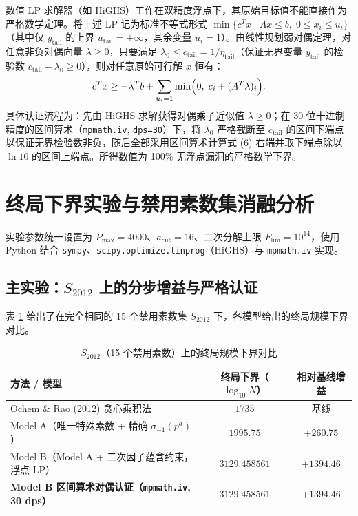 \documentclass[11pt, a4paper]{article}
\begin{document}
数值 LP 求解器（如 HiGHS）工作在双精度浮点下，其原始目标值不能直接作为严格数学定理。将上述 LP 记为标准不等式形式 $\min \{c^T x \mid A x \le b,\; 0 \le x_i \le u_i\}$（其中仅 $y_{\mathrm{tail}}$ 的上界 $u_{\mathrm{tail}} = +\infty$，其余变量 $u_i = 1$）。由线性规划弱对偶定理，对任意非负对偶向量 $\lambda \ge 0$，只要满足 $\lambda_0 \le c_{\mathrm{tail}} = 1/\eta_{\mathrm{tail}}$（保证无界变量 $y_{\mathrm{tail}}$ 的检验数 $c_{\mathrm{tail}} - \lambda_0 \ge 0$），则对任意原始可行解 $x$ 恒有：
\begin{equation}
c^T x \ge -\lambda^T b + \sum_{u_i = 1} \min\Bigl(0,\; c_i + (A^T \lambda)_i\Bigr).
\end{equation}
具体认证流程为：先由 HiGHS 求解获得对偶乘子近似值 $\lambda \ge 0$；在 30 位十进制精度的区间算术（\texttt{mpmath.iv}, \texttt{dps=30}）下，将 $\lambda_0$ 严格截断至 $c_{\mathrm{tail}}$ 的区间下端点以保证无界检验数非负，随后全部采用区间算术计算式 (6) 右端并取下端点除以 $\ln 10$ 的区间上端点。所得数值为 100\% 无浮点漏洞的严格数学下界。

\section{终局下界实验与禁用素数集消融分析}

实验参数统一设置为 $P_{\max} = 4000$、$a_{\mathrm{cut}} = 16$、二次分解上限 $F_{\mathrm{lim}} = 10^{14}$，使用 Python 结合 \texttt{sympy}、\texttt{scipy.optimize.linprog}（HiGHS）与 \texttt{mpmath.iv} 实现。

\subsection{主实验：$S_{2012}$ 上的分步增益与严格认证}

表 \ref{tab:main_endgame} 给出了在完全相同的 15 个禁用素数集 $S_{2012}$ 下，各模型给出的终局规模下界对比。

\begin{table}[htbp]
\centering
\caption{$S_{2012}$（15 个禁用素数）上的终局规模下界对比}
\label{tab:main_endgame}
\begin{tabular}{@{}lcc@{}}
\toprule
方法 / 模型 & 终局下界（$\log_{10} N$） & 相对基线增益 \\
\midrule
Ochem \& Rao (2012) 贪心乘积法 & $1735$ & 基线 \\
Model A（唯一特殊素数 + 精确 $\sigma_{-1}(p^a)$） & $1995.75$ & $+260.75$ \\
Model B（Model A + 二次因子蕴含约束，浮点 LP） & $3129.458561$ & $+1394.46$ \\
\textbf{Model B 区间算术对偶认证（\texttt{mpmath.iv}, 30 dps）} & $\mathbf{3129.458561}$ & $\mathbf{+1394.46}$ \\
\bottomrule
\end{tabular}
\end{table}
\end{document}
